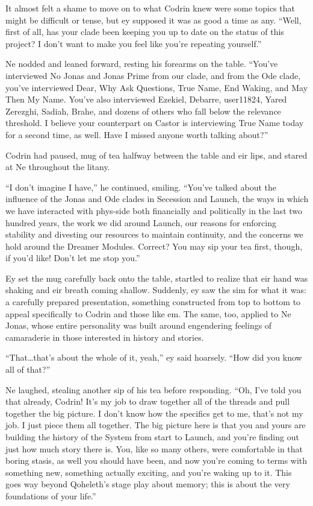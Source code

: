 It almost felt a shame to move on to what Codrin knew were some topics that might be difficult or tense, but ey supposed it was as good a time as any. ``Well, first of all, has your clade been keeping you up to date on the status of this project? I don't want to make you feel like you're repeating yourself.''

Ne nodded and leaned forward, resting his forearms on the table. ``You've interviewed No Jonas and Jonas Prime from our clade, and from the Ode clade, you've interviewed Dear, Why Ask Questions, True Name, End Waking, and May Then My Name. You've also interviewed Ezekiel, Debarre, user11824, Yared Zerezghi, Sadiah, Brahe, and dozens of others who fall below the relevance threshold. I believe your counterpart on Castor is interviewing True Name today for a second time, as well. Have I missed anyone worth talking about?''

Codrin had paused, mug of tea halfway between the table and eir lips, and stared at Ne throughout the litany.

``I don't imagine I have,'' he continued, smiling. ``You've talked about the influence of the Jonas and Ode clades in Secession and Launch, the ways in which we have interacted with phys-side both financially and politically in the last two hundred years, the work we did around Launch, our reasons for enforcing stability and divesting our resources to maintain continuity, and the concerns we hold around the Dreamer Modules. Correct? You may sip your tea first, though, if you'd like! Don't let me stop you.''

Ey set the mug carefully back onto the table, startled to realize that eir hand was shaking and eir breath coming shallow. Suddenly, ey saw the sim for what it was: a carefully prepared presentation, something constructed from top to bottom to appeal specifically to Codrin and those like em. The same, too, applied to Ne Jonas, whose entire personality was built around engendering feelings of camaraderie in those interested in history and stories.

``That\ldots that's about the whole of it, yeah,'' ey said hoarsely. ``How did you know all of that?''

Ne laughed, stealing another sip of his tea before responding. ``Oh, I've told you that already, Codrin! It's my job to draw together all of the threads and pull together the big picture. I don't know how the specifics get to me, that's not my job. I just piece them all together. The big picture here is that you and yours are building the history of the System from start to Launch, and you're finding out just how much story there is. You, like so many others, were comfortable in that boring stasis, as well you should have been, and now you're coming to terms with something new, something actually exciting, and you're waking up to it. This goes way beyond Qoheleth's stage play about memory; this is about the very foundations of your life.''

